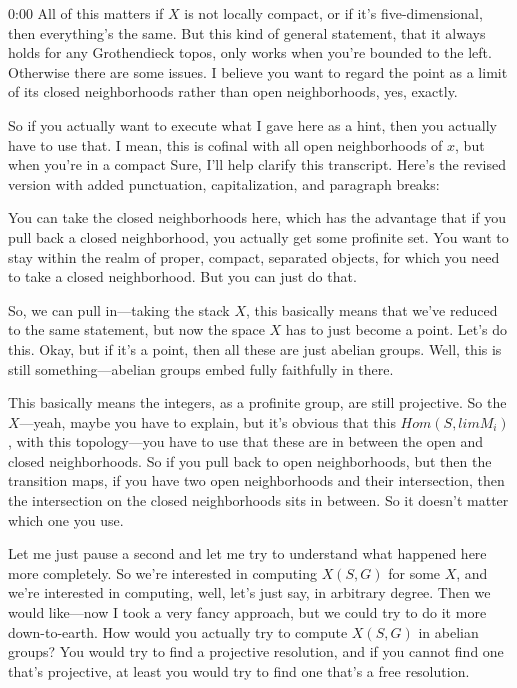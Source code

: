 \begin{unfinished}{0:00}
All of this matters if $X$ is not locally compact, or if it's five-dimensional, then everything's the same. But this kind of general statement, that it always holds for any Grothendieck topos, only works when you're bounded to the left. Otherwise there are some issues. I believe you want to regard the point as a limit of its closed neighborhoods rather than open neighborhoods, yes, exactly.

So if you actually want to execute what I gave here as a hint, then you actually have to use that. I mean, this is cofinal with all open neighborhoods of $x$, but when you're in a compact
Sure, I'll help clarify this transcript. Here's the revised version with added punctuation, capitalization, and paragraph breaks:

You can take the closed neighborhoods here, which has the advantage that if you pull back a closed neighborhood, you actually get some profinite set. You want to stay within the realm of proper, compact, separated objects, for which you need to take a closed neighborhood. But you can just do that.

So, we can pull in---taking the stack $X$, this basically means that we've reduced to the same statement, but now the space $X$ has to just become a point. Let's do this. Okay, but if it's a point, then all these are just abelian groups. Well, this is still something---abelian groups embed fully faithfully in there.

This basically means the integers, as a profinite group, are still projective. So the $X$---yeah, maybe you have to explain, but it's obvious that this $Hom(S, lim M_i)$, with this topology---you have to use that these are in between the open and closed neighborhoods. So if you pull back to open neighborhoods, but then the transition maps, if you have two open neighborhoods and their intersection, then the intersection on the closed neighborhoods sits in between. So it doesn't matter which one you use.

Let me just pause a second and let me try to understand what happened here more completely. So we're interested in computing $X(S, G)$ for some $X$, and we're interested in computing, well, let's just say, in arbitrary degree. Then we would like---now I took a very fancy approach, but we could try to do it more down-to-earth. How would you actually try to compute $X(S, G)$ in abelian groups? You would try to find a projective resolution, and if you cannot find one that's projective, at least you would try to find one that's a free resolution.


\end{unfinished}
